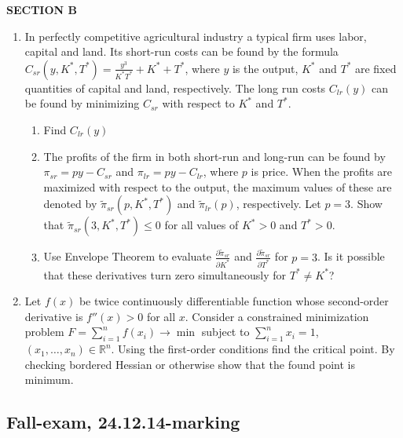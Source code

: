 \textbf{SECTION B}

\begin{enumerate}[resume]
\item In perfectly competitive agricultural industry a typical firm uses labor, capital and land. Its short-run costs can be found by the formula $C_{sr}(y,K^*,T^*)=\frac{y^3}{K^*T^*}+K^*+T^*$, where $y$  is the output, $K^*$  and $T^*$  are fixed quantities of capital and land, respectively.
The long run costs $C_{lr}(y)$ can be found by minimizing $C_{sr}$ with respect to $K^*$  and $T^*$.
\begin{enumerate}
\item Find  $C_{lr}(y)$
\item The profits of the firm in both short-run and long-run can be found by $\pi_{sr}=py-C_{sr}$  and   $\pi_{lr}=py-C_{lr}$, where $p$ is price. When the profits are maximized with respect to the output, the maximum values of these are denoted by $\tilde{\pi}_{sr}(p,K^*,T^*)$ and $\tilde{\pi}_{lr}(p)$, respectively. Let $p=3$. Show that $\tilde{\pi}_{sr}(3,K^*,T^*) \leq 0$ for all values of  $K^*>0$  and  $T^*>0$.
\item Use Envelope Theorem to evaluate $\frac{\partial \tilde{\pi}_{sr}}{\partial K^*}$ and $\frac{\partial \tilde{\pi}_{sr}}{\partial T^*}$ for $p=3$. Is it possible that these derivatives turn zero simultaneously for $T^* \neq K^*$?
\end{enumerate}

\item Let $f(x)$ be twice continuously differentiable function whose second-order derivative is $f''(x)>0$ for all $x$. Consider a constrained minimization problem $F=\sum_{i=1}^n f(x_i) \to \min$
subject to $\sum_{i=1}^n x_i = 1$,  $(x_1, \ldots, x_n)\in \mathbb{R}^n$. Using the first-order conditions find the critical point. By checking bordered Hessian or otherwise show that the found point is minimum.
\end{enumerate}

\subsection{Fall-exam, 24.12.14-marking}

